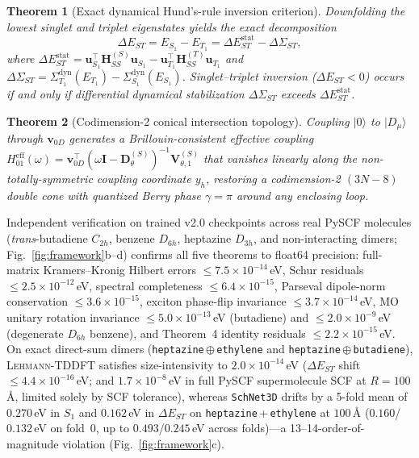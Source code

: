 \documentclass[10pt,twocolumn]{article}
\theoremstyle{natthm}
\newtheorem{theorem}{Theorem}
\newcommand{\leh}{\textsc{Lehmann-TDDFT}}
\newcommand{\dEST}{\Delta E_{ST}}
\newcommand{\dSig}{\Delta\Sigma_{ST}}
\begin{document}
\begin{theorem}[Exact dynamical Hund's-rule inversion criterion]
Downfolding the lowest singlet and triplet eigenstates yields the exact decomposition
\begin{equation}
\dEST = E_{S_1}-E_{T_1} = \dEST^{\mathrm{stat}} - \dSig,
\label{eq:thm4}
\end{equation}
where $\dEST^{\mathrm{stat}}=\mathbf{u}_{S_1}^\top\mathbf{H}_{SS}^{(S)}\mathbf{u}_{S_1}-\mathbf{u}_{T_1}^\top\mathbf{H}_{SS}^{(T)}\mathbf{u}_{T_1}$ and $\dSig=\Sigma_{T_1}^{\mathrm{dyn}}(E_{T_1})-\Sigma_{S_1}^{\mathrm{dyn}}(E_{S_1})$. Singlet--triplet inversion ($\dEST<0$) occurs if and only if differential dynamical stabilization $\dSig$ exceeds $\dEST^{\mathrm{stat}}$.
\end{theorem}

\begin{theorem}[Codimension-2 conical intersection topology]
Coupling $|0\rangle$ to $|D_\mu\rangle$ through $\mathbf{v}_{0D}$ generates a Brillouin-consistent effective coupling $H_{01}^{\mathrm{eff}}(\omega)=\mathbf{v}_{0D}^\top(\omega\mathbf{I}-\mathbf{D}_\theta^{(S)})^{-1}\mathbf{V}_{\theta,1}^{(S)}$ that vanishes linearly along the non-totally-symmetric coupling coordinate $y_h$, restoring a codimension-2 $(3N{-}8)$ double cone with quantized Berry phase $\gamma=\pi$ around any enclosing loop.
\end{theorem}

Independent verification on trained v2.0 checkpoints across real PySCF\cite{sun2020pyscf} molecules (\emph{trans}-butadiene $C_{2h}$, benzene $D_{6h}$, heptazine $D_{3h}$, and non-interacting dimers; Fig.~\ref{fig:framework}b--d) confirms all five theorems to float64 precision: full-matrix Kramers--Kronig Hilbert errors $\le 7.5\times 10^{-14}$\,eV, Schur residuals $\le 2.5\times 10^{-12}$\,eV, spectral completeness $\le 6.4\times 10^{-15}$, Parseval dipole-norm conservation $\le 3.6\times 10^{-15}$, exciton phase-flip invariance $\le 3.7\times 10^{-14}$\,eV, MO unitary rotation invariance $\le 5.0\times 10^{-13}$\,eV (butadiene) and $\le 2.0\times 10^{-9}$\,eV (degenerate $D_{6h}$ benzene), and Theorem~4 identity residuals $\le 2.2\times 10^{-15}$\,eV.
On exact direct-sum dimers (\texttt{heptazine}\,$\oplus$\,\texttt{ethylene} and \texttt{heptazine}\,$\oplus$\,\texttt{butadiene}), \leh{} satisfies size-intensivity to $2.0\times 10^{-14}$\,eV ($\dEST$ shift $\le 4.4\times 10^{-16}$\,eV; and $1.7\times 10^{-8}$\,eV in full PySCF supermolecule SCF at $R=100$\,\AA, limited solely by SCF tolerance), whereas \texttt{SchNet3D}\cite{schutt2018schnet} drifts by a 5-fold mean of $0.270$\,eV in $S_1$ and $0.162$\,eV in $\dEST$ on \texttt{heptazine}\,+\,\texttt{ethylene} at $100$\,\AA{} ($0.160$/$0.132$\,eV on fold~0, up to $0.493$/$0.245$\,eV across folds)---a 13--14-order-of-magnitude violation (Fig.~\ref{fig:framework}c).
\end{document}
